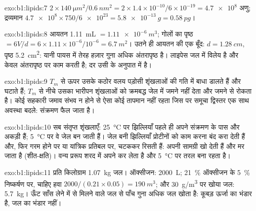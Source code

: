 \begin{solution}{exo:b1:lipids:7}
$2\times\qty{140}{\micro m^2}/\qty{0.6}{nm^2} = 2\times 1.4\times
10^{-10}/6\times 10^{-19} = \num{4.7e8}$ अणु; द्रव्यमान
$\num{4.7e8}\times 750/\num{6e23} = \qty{5.8e-13}{g} = \qty{0.58}{pg}$।
\end{solution}

\begin{solution}{exo:b1:lipids:8}
आयतन \qty{1.11}{mL} $= \qty{1.11e-6}{m^3}$; गोलों का पृष्ठ
$= 6V/d = 6\times 1.11\times 10^{-6}/10^{-6} = \qty{6.7}{m^2}$। उतने ही
आयतन की एक बूँद: $d = \qty{1.28}{cm}$, पृष्ठ \qty{5.2}{cm^2}: यानी
पायस में तेरह हज़ार गुना अधिक अंतरापृष्ठ है। लाइपेस जल में विलेय है
और केवल अंतरापृष्ठ पर काम करती है; दर उसी के अनुपात में है।
\end{solution}

\begin{solution}{exo:b1:lipids:9}
$T_m$ से ऊपर उसके कठोर वलय पड़ोसी शृंखलाओं की गति में बाधा डालते हैं और
 घटाते हैं; $T_m$ से नीचे उसका भारीपन शृंखलाओं को क्रमबद्ध जेल में
जमने नहीं देता और जमने से रोकता है। कोई सहकारी जमाव संभव न होने से ऐसा
कोई तापमान नहीं रहता जिस पर समूचा द्विस्तर एक साथ अवस्था बदले: संक्रमण
फैल जाता है।
\end{solution}

\begin{solution}{exo:b1:lipids:10}
सब संतृप्त शृंखलाएँ: \qty{25}{\celsius} पर झिल्लियाँ पहले ही
अपने संक्रमण के पास और अकड़ी हैं; \qty{5}{\celsius} पर वे जेल बन जाती हैं।
जेल बनी झिल्लियाँ प्रोटीनों को काम करना बंद करा देती हैं और, फिर गरम होने
पर या यांत्रिक प्रतिबल पर, चटककर रिसती हैं:  अपनी सामग्री खो देती
हैं और  मर जाता है (शीत-क्षति)। वन्य प्ररूप शरद में अपने
  कर लेता है और \qty{5}{\celsius} पर तरल बना रहता है।
\end{solution}

\begin{solution}{exo:b1:lipids:11}
प्रति किलोग्राम  \qty{1.07}{kg} जल। ऑक्सीजन: \qty{2000}{L};
\qty{21}{\%} ऑक्सीजन के \qty{5}{\%} निष्कर्षण पर, चाहिए हवा
$2000/(0.21\times 0.05) = \qty{190}{m^3}$; और \qty{30}{g/m^3} पर खोया
जल: \qty{5.7}{kg}। ऊँट साँस लेने में  से मिलने वाले जल से पाँच गुना
अधिक जल खोता है: कूबड़ ऊर्जा का भंडार है, जल का
भंडार नहीं।
\end{solution}

